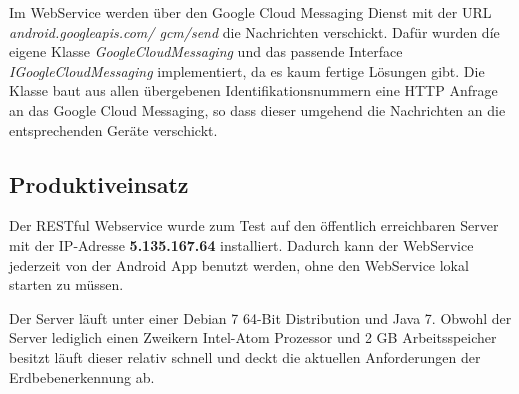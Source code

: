 Im WebService werden über den Google Cloud Messaging Dienst mit der URL \textit{android.googleapis.com/ gcm/send} die Nachrichten verschickt. Dafür wurden díe eigene Klasse \textit{GoogleCloudMessaging} und das passende Interface \textit{IGoogleCloudMessaging} implementiert, da es kaum fertige Lösungen gibt. Die Klasse baut aus allen übergebenen Identifikationsnummern eine HTTP Anfrage an das Google Cloud Messaging, so dass dieser umgehend die Nachrichten an die entsprechenden Geräte verschickt.

\subsection{Produktiveinsatz}
Der RESTful Webservice wurde zum Test auf den öffentlich erreichbaren Server mit der IP-Adresse \textbf{5.135.167.64} installiert. Dadurch kann der WebService jederzeit von der Android App benutzt werden, ohne den WebService lokal starten zu müssen. 

Der Server läuft unter einer Debian 7 64-Bit Distribution und Java 7. Obwohl der Server lediglich einen Zweikern Intel-Atom Prozessor und 2 GB Arbeitsspeicher besitzt läuft dieser relativ schnell und deckt die aktuellen Anforderungen der Erdbebenerkennung ab.